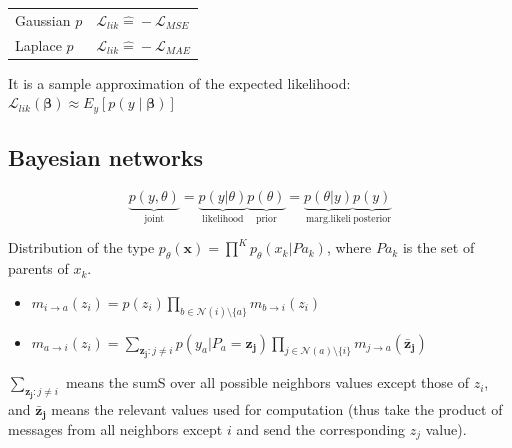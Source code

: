 \documentclass[10pt,a4paper,landscape]{article}
\newcommand{\bbeta}{\boldsymbol\beta}
\renewcommand{\vec}{\mathbf}
\begin{document}
\begin{multicols*}{4}
\begin{tabular}{ l  l }
  \hline
  Gaussian $p$ & $\mathcal{L}_{lik} \widehat{=} -\mathcal{L}_{MSE}$ \\
  Laplace $p$  & $\mathcal{L}_{lik} \widehat{=} -\mathcal{L}_{MAE}$ \\
  \hline
\end{tabular}

It is a sample approximation of the expected likelihood:
$\mathcal{L}_{lik}(\bbeta) \approx E_y[ p(y \mid \bbeta) ]$

\subsection{Bayesian networks}
\[
	\underbrace{p(y, \theta)}_{\text{joint}} = \underbrace{p(y|\theta)}_{\text{likelihood}}\underbrace{p(\theta)}_{\text{prior}} = \underbrace{p(\theta | y)}_{\text{marg.likeli}}\underbrace{p(y)}_{\text{posterior}}
\]

Distribution of the type $p_\theta(\vec{x}) = \prod^Kp_\theta(x_k | Pa_k)$, where $Pa_k$ is the set of parents of $x_k$.
\begin{itemize}
	\item $m_{i\to a}(z_i) = p(z_i)\prod_{b\in\mathcal{N}(i) \setminus \{a\}}m_{b\to i}(z_i)$
	\item $m_{a\to i}(z_i)= \sum_{\vec{z_j}: j \neq i}p(y_a | P_a = \vec{z_j})\prod_{j\in\mathcal{N}(a) \setminus \{i\}}m_{j\to a}(\vec{\bar{z}_j})$
\end{itemize}
 $\sum_{\vec{z_j}: j \neq i}$ means the sumS over all possible neighbors values except those of $z_i$, and $\vec{\bar{z}_j}$ means the relevant values used for computation (thus take the product of messages from all neighbors except $i$ and send the corresponding $z_j$ value).


\end{multicols*}
\end{document}
